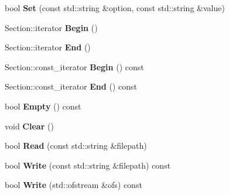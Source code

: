 \begin{DoxyCompactItemize}
\item 
bool {\bfseries Set} (const std\+::string \&option, const std\+::string \&value)\hypertarget{classlog2hdfs_1_1Section_ae87ec7d9f427d7960642e7ffce441320}{}\label{classlog2hdfs_1_1Section_ae87ec7d9f427d7960642e7ffce441320}

\item 
Section\+::iterator {\bfseries Begin} ()\hypertarget{classlog2hdfs_1_1Section_a53d856f5f884713c8a9af0a987f828db}{}\label{classlog2hdfs_1_1Section_a53d856f5f884713c8a9af0a987f828db}

\item 
Section\+::iterator {\bfseries End} ()\hypertarget{classlog2hdfs_1_1Section_aaf26649df0dfb29cfb183ca43bec1fc0}{}\label{classlog2hdfs_1_1Section_aaf26649df0dfb29cfb183ca43bec1fc0}

\item 
Section\+::const\+\_\+iterator {\bfseries Begin} () const \hypertarget{classlog2hdfs_1_1Section_aad7045f150705952a201a971674c3343}{}\label{classlog2hdfs_1_1Section_aad7045f150705952a201a971674c3343}

\item 
Section\+::const\+\_\+iterator {\bfseries End} () const \hypertarget{classlog2hdfs_1_1Section_a3460199936a5f723aa3576047c65e451}{}\label{classlog2hdfs_1_1Section_a3460199936a5f723aa3576047c65e451}

\item 
bool {\bfseries Empty} () const \hypertarget{classlog2hdfs_1_1Section_ae3d42af0cf5fd256b507c9e5a1e1c0d9}{}\label{classlog2hdfs_1_1Section_ae3d42af0cf5fd256b507c9e5a1e1c0d9}

\item 
void {\bfseries Clear} ()\hypertarget{classlog2hdfs_1_1Section_ae5a4b3417b3bd6e0aceaf50e481c3c9e}{}\label{classlog2hdfs_1_1Section_ae5a4b3417b3bd6e0aceaf50e481c3c9e}

\item 
bool {\bfseries Read} (const std\+::string \&filepath)\hypertarget{classlog2hdfs_1_1Section_a524b6063691869f2e2d1d353551386b5}{}\label{classlog2hdfs_1_1Section_a524b6063691869f2e2d1d353551386b5}

\item 
bool {\bfseries Write} (const std\+::string \&filepath) const \hypertarget{classlog2hdfs_1_1Section_a104102e5750e73b6fb6497f8561a2842}{}\label{classlog2hdfs_1_1Section_a104102e5750e73b6fb6497f8561a2842}

\item 
bool {\bfseries Write} (std\+::ofstream \&ofs) const \hypertarget{classlog2hdfs_1_1Section_ac478942a1456b7efed416ee5b65cec86}{}\label{classlog2hdfs_1_1Section_ac478942a1456b7efed416ee5b65cec86}

\end{DoxyCompactItemize}
